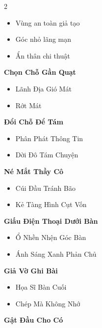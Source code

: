 \begin{multicols}{2}
\begin{itemize}[leftmargin=1.2em, itemsep=0.1em, label=\textcolor{titlecolor}{\tiny$\blacksquare$}]
  \item Vùng an toàn giả tạo
  \item Góc nhỏ lãng mạn
  \item Ẩn thân chi thuật
\end{itemize}
\vspace{0.8em}
\textbf{\color{chapterline}Chọn Chỗ Gần Quạt}
\begin{itemize}[leftmargin=1.2em, itemsep=0.1em, label=\textcolor{titlecolor}{\tiny$\blacksquare$}]
  \item Lãnh Địa Gió Mát
  \item Rớt Mát
\end{itemize}
\vspace{0.8em}
\textbf{\color{chapterline}Đổi Chỗ Để Tám}
\begin{itemize}[leftmargin=1.2em, itemsep=0.1em, label=\textcolor{titlecolor}{\tiny$\blacksquare$}]
  \item Phân Phát Thông Tin
  \item Dời Đô Tám Chuyện
\end{itemize}
\vspace{0.8em}
\textbf{\color{chapterline}Né Mắt Thầy Cô}
\begin{itemize}[leftmargin=1.2em, itemsep=0.1em, label=\textcolor{titlecolor}{\tiny$\blacksquare$}]
  \item Cúi Đầu Tránh Bão
  \item Kẻ Tàng Hình Cụt Vốn
\end{itemize}
\vspace{0.8em}
\textbf{\color{chapterline}Giấu Điện Thoại Dưới Bàn}
\begin{itemize}[leftmargin=1.2em, itemsep=0.1em, label=\textcolor{titlecolor}{\tiny$\blacksquare$}]
  \item Ổ Nhền Nhện Góc Bàn
  \item Ánh Sáng Xanh Phản Chủ
\end{itemize}
\vspace{0.8em}
\textbf{\color{chapterline}Giả Vờ Ghi Bài}
\begin{itemize}[leftmargin=1.2em, itemsep=0.1em, label=\textcolor{titlecolor}{\tiny$\blacksquare$}]
  \item Họa Sĩ Bàn Cuối
  \item Chép Mà Không Nhớ
\end{itemize}
\vspace{0.8em}
\textbf{\color{chapterline}Gật Đầu Cho Có}
\begin{itemize}[leftmargin=1.2em, itemsep=0.1em, label=\textcolor{titlecolor}{\tiny$\blacksquare$}]

\end{itemize}
\end{multicols}
